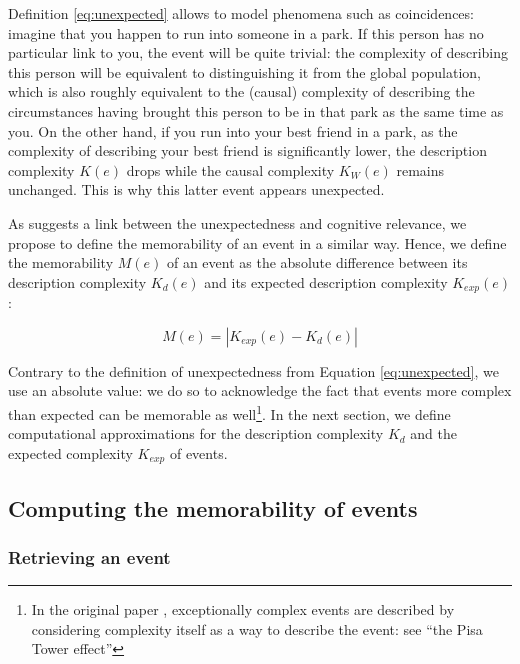 \documentclass[entropy,article,submit,moreauthors,pdftex]{Definitions/mdpi}
\begin{document}
Definition \ref{eq:unexpected} allows to model phenomena
such as coincidences: imagine that you happen to run into someone in a park.
If this person has no particular link to you, the event will be quite
trivial: the complexity of describing this person will be equivalent to
distinguishing it from the global population, which is also roughly
equivalent to the (causal) complexity of describing the circumstances having brought this person to be in
that park as the same time as you. On the other hand, if you run into your best friend in
a park, as the complexity of describing your best friend is significantly
lower, the description complexity $K(e)$ drops while the causal complexity
$K_W (e)$ remains unchanged. This is why this latter  event appears unexpected.

As \cite{dessalles2011coincidences} suggests a link between the unexpectedness and cognitive relevance, we propose to define the memorability of an event in a similar way.  
Hence, we define the memorability $M(e)$ of an event as the absolute difference between its description complexity $K_d(e)$ and its expected description complexity $K_{exp}(e)$:

\begin{equation}
    \label{eq:memorability}
    M(e) = |K_{exp}(e) - K_d(e)|
\end{equation}

Contrary to the definition of unexpectedness from Equation \ref{eq:unexpected}, we use an absolute value: we do so to acknowledge the fact that events more complex than expected can be memorable as well\footnote{In the original paper \cite{dessalles2011coincidences}, exceptionally complex events are described by considering complexity itself as a way to describe the event: see ``the Pisa Tower effect''\cite{dessalles_pisa_nodate}}. In the next section, we define computational approximations for the description complexity $K_d$ and the expected complexity $K_{exp}$ of events.

\subsection{Computing the memorability of events}
\label{sec:computing}
\subsubsection{Retrieving an event}
\end{document}
